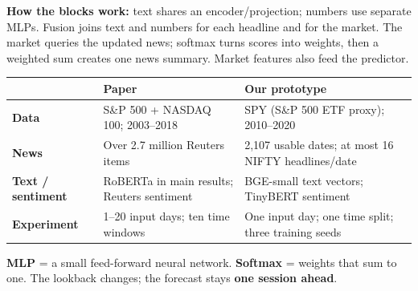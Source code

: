 \documentclass[11pt,a4paper,landscape]{article}
\newcommand{\sub}[1]{\vspace{3pt}{\large\bfseries\color{navy}#1}\par}
\begin{document}
\begin{center}
\end{center}
{\small\color{slate}\textbf{How the blocks work:} text shares an encoder/projection; numbers use separate MLPs. Fusion joins text and numbers for each headline and for the market. The market queries the updated news; softmax turns scores into weights, then a weighted sum creates one news summary. Market features also feed the predictor.}

\sub{The essential differences}
\begin{tabularx}{\linewidth}{@{}p{3cm}YY@{}}
\toprule
 & \textbf{Paper} & \textbf{Our prototype}\\\midrule
\textbf{Data} & S\&P 500 + NASDAQ 100; 2003--2018 & SPY (S\&P 500 ETF proxy); 2010--2020\\
\textbf{News} & Over 2.7 million Reuters items & 2,107 usable dates; at most 16 NIFTY headlines/date\\
\textbf{Text / sentiment} & RoBERTa in main results; Reuters sentiment & BGE-small text vectors; TinyBERT sentiment\\
\textbf{Experiment} & 1--20 input days; ten time windows & One input day; one time split; three training seeds\\
\bottomrule
\end{tabularx}\par
\vspace{3pt}
{\small \textbf{MLP} = a small feed-forward neural network. \textbf{Softmax} = weights that sum to one. The lookback changes; the forecast stays \textbf{one session ahead}.}
\end{document}
